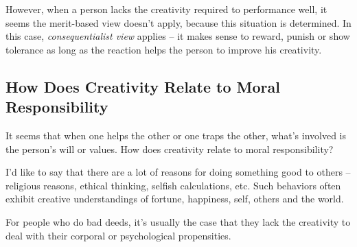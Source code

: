 However, when a person lacks the creativity required to performance well, it seems the merit-based view doesn't apply, because this situation is determined. In this case, \emph{consequentialist view} applies -- it makes sense to reward, punish or show tolerance as long as the reaction helps the person to improve his creativity.

\subsection{How Does Creativity Relate to Moral Responsibility}

It seems that when one helps the other or one traps the other, what's involved is the person's will or values. How does creativity relate to moral responsibility?

I'd like to say that there are a lot of reasons for doing something good to others -- religious reasons, ethical thinking, selfish calculations, etc. Such behaviors often exhibit creative understandings of fortune, happiness, self, others and the world.

For people who do bad deeds, it's usually the case that they lack the creativity to deal with their corporal or psychological propensities.
